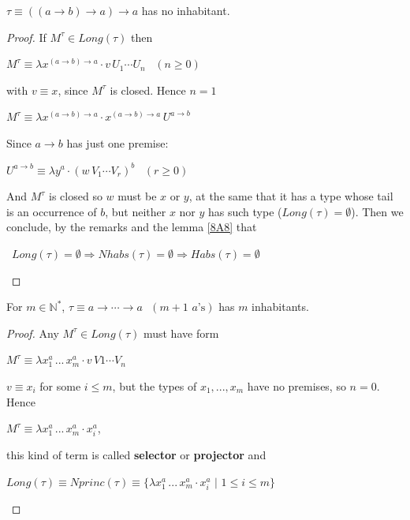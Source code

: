 \documentclass[a4paper,10pt]{article}
\begin{document}
\vspace*{0.5 cm}

\begin{exa}
$\tau \equiv ((a \rightarrow b) \rightarrow a) \rightarrow a$ has no inhabitant.
\begin{proof}
  If $M^{\tau} \in Long(\tau)$ then 
  \begin{center}
       $M^{\tau} \equiv \lambda x^{(a\to b) \to a} \cdot v\,U_1\cdots U_n\,\,\,\,\,(n \geq 0)$
  \end{center}
with $v \equiv x$, since $M^{\tau}$ is closed. Hence $n = 1$
   \begin{center}
       $M^{\tau} \equiv \lambda x^{(a\to b) \to a} \cdot x^{(a\to b) \to a}\,U^{a\to b}$ 
   \end{center}
Since $a\to b$ has just one premise:
   \begin{center}
    $U^{a\to b} \equiv \lambda y^a \cdot (w\,V_1\cdots V_r)^b\,\,\,\,\, (r \geq 0)$
   \end{center}
And $M^{\tau}$ is closed so $w$ must be $x$ or $y$, at the same that it has 
a type whose tail is an occurrence of $b$, but neither $x$ nor $y$ has such type ($Long(\tau) = \emptyset$). Then we 
conclude, by the remarks and the lemma \ref{8A8} that
    \begin{center}\
    $Long(\tau) = \emptyset \Rightarrow Nhabs(\tau) = \emptyset \Rightarrow Habs(\tau) =\emptyset$
    \end{center}
\end{proof}
\end{exa}

\begin{exa}[A type $\tau$ with $\#(\tau) = m$]\label{8B4}
For $m \in \mathbb{N}^*$,  $\tau \equiv a \rightarrow \cdots \rightarrow a\,\,\,\,(m + 1\,\,a\mbox{'s})$ has $m$ inhabitants.
\begin{proof}
 Any $M^{\tau} \in Long(\tau)$ must have form
 \begin{center}
  $M^\tau \equiv \lambda x_1^a\,...\, x_m^a \cdot v\,V1 \cdots V_n$
 \end{center}
$v \equiv x_i$ for some $i\leq m$, but the types of $x_1, ..., x_m$ have no premises, so $n = 0$. Hence 
\begin{center}
 $M^{\tau} \equiv \lambda x_1^a\,...\,x_m^a \cdot x_i^a$,
\end{center}
this kind of term is called \textbf{selector} or \textbf{projector} and
\begin{center}
 $Long(\tau) \equiv Nprinc(\tau) \equiv \{\lambda x_1^a\,...\,x_m^a \cdot x_i^a\,\,|\,\,1\leq i\leq m\}$
\end{center}

\end{proof}

\end{exa}
\end{document}
